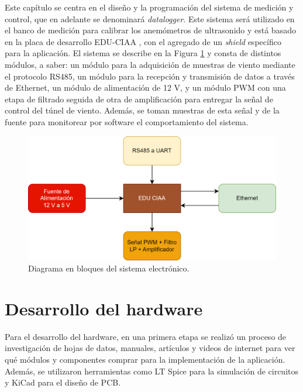 Este capítulo se centra en el diseño y la programación del sistema de medición y control, que en adelante se denominará \textit{datalogger}. Este sistema será utilizado en el banco de medición para calibrar los anemómetros de ultrasonido y está basado en la placa de desarrollo EDU-CIAA \cite{proyectoCIAA}, con el agregado de un \textit{shield} específico para la aplicación. El sistema se describe en la Figura \ref{fig:esquemaHardware} y consta de distintos módulos, a saber: un módulo para la adquisición de muestras de viento mediante el protocolo RS485, un módulo para la recepción y transmisión de datos a través de Ethernet, un módulo de alimentación de 12 \unit{\volt}, y un módulo PWM con una etapa de filtrado seguida de otra de amplificación para entregar la señal de control del túnel de viento. Además, se toman muestras de esta señal y de la fuente para monitorear por software el comportamiento del sistema.


\begin{figure}[H]
    \centering
    \includegraphics[width=0.85\linewidth]{Figuras/datalogger/esquemaHardarware.png}
    \caption{Diagrama en bloques del sistema electrónico.}
    \label{fig:esquemaHardware}
\end{figure}




\section{Desarrollo del hardware}\label{sec:desarrolloHardware}


Para el desarrollo del hardware, en una primera etapa se realizó un proceso de investigación de hojas de datos, manuales, artículos y videos de internet para ver qué módulos y componentes comprar para la implementación de la aplicación. Además, se utilizaron herramientas como LT Spice para la simulación de circuitos y KiCad para el diseño de PCB. 

